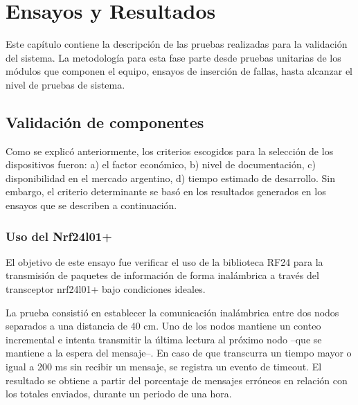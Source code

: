 
\chapter{Ensayos y Resultados} %

\label{Chapter4} %


Este capítulo contiene la  descripción de  las pruebas realizadas para la validación del sistema. La metodología para esta fase parte desde pruebas unitarias de los módulos que componen el equipo, ensayos de inserción de fallas, hasta alcanzar el nivel de pruebas de sistema.

\section{Validación de componentes}
\label{sec:validacion_componentes}

Como se explicó anteriormente, los criterios escogidos para la selección de los dispositivos fueron: a) el factor económico, b) nivel de documentación, c) disponibilidad en el mercado argentino, d) tiempo estimado de desarrollo. Sin embargo, el criterio determinante se basó en los resultados generados en los ensayos que se describen a continuación.

\subsection{Uso del Nrf24l01+}

El objetivo de este ensayo fue verificar el uso de la biblioteca RF24 para la transmisión de paquetes de información de forma inalámbrica a través del transceptor nrf24l01+ bajo condiciones ideales.

La prueba consistió  en establecer la comunicación inalámbrica entre dos nodos separados a una distancia de 40 cm. Uno de los nodos mantiene un conteo incremental e intenta transmitir la última lectura al próximo nodo --que se mantiene a la espera del mensaje--. En caso de que transcurra un tiempo mayor o igual a 200 ms sin recibir un mensaje, se registra un evento de timeout. El resultado se obtiene a partir del porcentaje de mensajes erróneos en relación con los totales enviados, durante un periodo de una hora.

